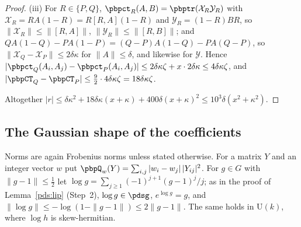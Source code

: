 \documentclass[10pt]{amsart}
\theoremstyle{definition}
\theoremstyle{remark}
\providecommand{\auU}{\mathrm U}
\begin{document}
\begin{proof}
(iii) For $R\in\{P,Q\}$, $\pbpct_R(A,B)=\pbptr(\mathcal X_R\mathcal Y_R)$ with $\mathcal X_R=RA(1-R)=
R[R,A](1-R)$ and $\mathcal Y_R=(1-R)BR$, so $\|\mathcal X_R\|\le\|[R,A]\|$, $\|\mathcal Y_R\|\le
\|[R,B]\|$; and $QA(1-Q)-PA(1-P)=(Q-P)A(1-Q)-PA(Q-P)$, so $\|\mathcal X_Q-\mathcal X_P\|\le2\delta\kappa$
for $\|A\|\le\delta$, and likewise for $\mathcal Y$. Hence $|\pbpct_Q(A_i,A_j)-\pbpct_P(A_i,A_j)|\le
2\delta\kappa\zeta+x\cdot2\delta\kappa\le4\delta\kappa\zeta$, and $|\pbpCT_Q-\pbpCT_P|\le\frac92\cdot
4\delta\kappa\zeta=18\delta\kappa\zeta$.

Altogether $|r|\le\delta\kappa^2+18\delta\kappa(x+\kappa)+400\delta(x+\kappa)^2\le10^3\delta(x^2+
\kappa^2)$.
\end{proof}

\subsection{The Gaussian shape of the coefficients}\label{pbp:ss-gauss}

Norms are again Frobenius norms unless stated otherwise. For a matrix $Y$ and an integer vector $w$
put $\pbpQ_w(Y)=\sum_{i,j}|w_i-w_j|\,|Y_{ij}|^2$. For $g\in G$ with $\|g-1\|\le\frac12$ let $\log g=
\sum_{j\ge1}(-1)^{j+1}(g-1)^j/j$; as in the proof of Lemma~\ref{pds:lip} (Step~2), $\log g\in\pdsg$,
$e^{\log g}=g$, and $\|\log g\|\le-\log(1-\|g-1\|)\le2\|g-1\|$. The same holds in $\auU(k)$, where
$\log h$ is skew-hermitian.
\end{document}
